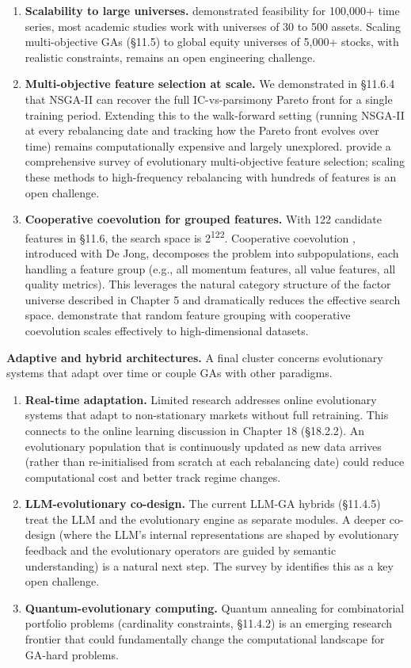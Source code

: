 \begin{enumerate}[resume]
\item \textbf{Scalability to large universes.} \cite{Huber2019} demonstrated feasibility for 100,000+ time series, most academic studies work with universes of 30 to 500 assets. Scaling multi-objective GAs (§11.5) to global equity universes of 5,000+ stocks, with realistic constraints, remains an open engineering challenge.
\item \textbf{Multi-objective feature selection at scale.} We demonstrated in §11.6.4 that NSGA-II can recover the full IC-vs-parsimony Pareto front for a single training period. Extending this to the walk-forward setting (running NSGA-II at every rebalancing date and tracking how the Pareto front evolves over time) remains computationally expensive and largely unexplored. \cite{Xue2016} provide a comprehensive survey of evolutionary multi-objective feature selection; scaling these methods to high-frequency rebalancing with hundreds of features is an open challenge.
\item \textbf{Cooperative coevolution for grouped features.} With 122 candidate features in §11.6, the search space is 2\textsuperscript{122}. Cooperative coevolution \citep{PotterDeJong2000}, introduced with De Jong, decomposes the problem into subpopulations, each handling a feature group (e.g., all momentum features, all value features, all quality metrics). This leverages the natural category structure of the factor universe described in Chapter 5 and dramatically reduces the effective search space. \cite{Rashid2020} demonstrate that random feature grouping with cooperative coevolution scales effectively to high-dimensional datasets.
\end{enumerate}

\textbf{Adaptive and hybrid architectures.} A final cluster concerns evolutionary systems that adapt over time or couple GAs with other paradigms.

\begin{enumerate}[resume]
\item \textbf{Real-time adaptation.} Limited research addresses online evolutionary systems that adapt to non-stationary markets without full retraining. This connects to the online learning discussion in Chapter 18 (§18.2.2). An evolutionary population that is continuously updated as new data arrives (rather than re-initialised from scratch at each rebalancing date) could reduce computational cost and better track regime changes.
\item \textbf{LLM-evolutionary co-design.} The current LLM-GA hybrids (§11.4.5) treat the LLM and the evolutionary engine as separate modules. A deeper co-design (where the LLM's internal representations are shaped by evolutionary feedback and the evolutionary operators are guided by semantic understanding) is a natural next step. The survey by \cite{ZhangJ2025} identifies this as a key open challenge.
\item \textbf{Quantum-evolutionary computing.} Quantum annealing for combinatorial portfolio problems (cardinality constraints, §11.4.2) is an emerging research frontier that could fundamentally change the computational landscape for GA-hard problems.
\end{enumerate}

